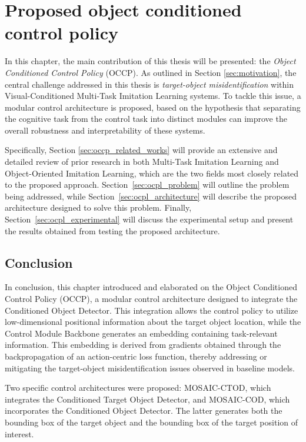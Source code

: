 \chapter{Proposed object conditioned control policy}
\label{ch:occp}
In this chapter, the main contribution of this thesis will be presented: the \textit{Object Conditioned Control Policy} (OCCP). As outlined in Section \ref{sec:motivation}, the central challenge addressed in this thesis is \textit{target-object misidentification} within Visual-Conditioned Multi-Task Imitation Learning systems. To tackle this issue, a modular control architecture is proposed, based on the hypothesis that separating the cognitive task from the control task into distinct modules can improve the overall robustness and interpretability of these systems.

Specifically, Section \ref{sec:occp_related_works} will provide an extensive and detailed review of prior research in both Multi-Task Imitation Learning and Object-Oriented Imitation Learning, which are the two fields most closely related to the proposed approach. Section~\ref{sec:ocpl_problem} will outline the problem being addressed, while Section~\ref{sec:ocpl_architecture} will describe the proposed architecture designed to solve this problem. Finally, Section~\ref{sec:ocpl_experimental} will discuss the experimental setup and present the results obtained from testing the proposed architecture.







\section{Conclusion}
In conclusion, this chapter introduced and elaborated on the Object Conditioned Control Policy (OCCP), a modular control architecture designed to integrate the Conditioned Object Detector. This integration allows the control policy to utilize low-dimensional positional information about the target object location, while the Control Module Backbone generates an embedding containing task-relevant information. This embedding is derived from gradients obtained through the backpropagation of an action-centric loss function, thereby addressing or mitigating the target-object misidentification issues observed in baseline models.

Two specific control architectures were proposed: MOSAIC-CTOD, which integrates the Conditioned Target Object Detector, and MOSAIC-COD, which incorporates the Conditioned Object Detector. The latter generates both the bounding box of the target object and the bounding box of the target position of interest.

